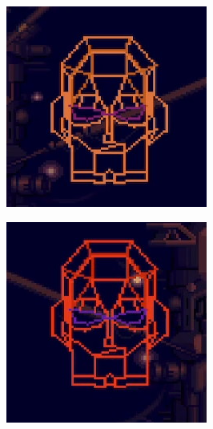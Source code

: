 \begin{figure}[htp]
	\begin{subfigure}{0.3\linewidth}	
		\centering
		\includegraphics[width=\linewidth]{figures/X2/Hunter_stages/Sigma_virus_phase_5.png}
	\end{subfigure}
	\begin{subfigure}{0.3\linewidth}
		\centering
		\includegraphics[width=\linewidth]{figures/X2/Hunter_stages/Sigma_virus_phase_6.png}	

\end{subfigure}
\end{figure}
